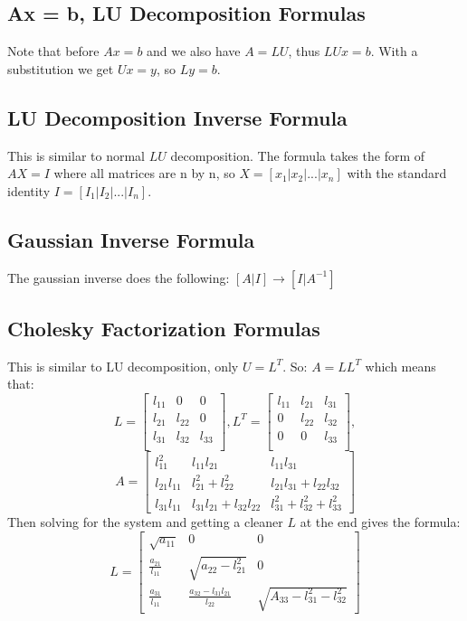 \subsection*{Ax = b, LU Decomposition Formulas}
Note that before $Ax = b$ and we also have $A = LU$, thus $LUx = b$. With a
substitution we get $Ux = y$, so $Ly = b$.

\subsection*{LU Decomposition Inverse Formula}
This is similar to normal $LU$ decomposition. The formula takes the form of
$AX = I$ where all matrices are n by n, so $X = [ x_1 | x_2 | ... | x_n ]$ with
the standard identity $I = [I_1 | I_2 | ... | I_n] $.

\subsection*{Gaussian Inverse Formula}
The gaussian inverse does the following: $[A | I] \rightarrow [I | A^{-1}]$

\subsection*{Cholesky Factorization Formulas}
This is similar to LU decomposition, only $U = L^T$. So: $A = L L^T$ which means
that:
\[
L =
\begin{bmatrix}
  l_{11} & 0 & 0 \\
  l_{21} & l_{22} & 0 \\
  l_{31} & l_{32} & l_{33} \\
\end{bmatrix},
L^T =
\begin{bmatrix}
  l_{11} & l_{21} & l_{31} \\
  0 & l_{22} & l_{32} \\
  0 & 0 & l_{33} \\
\end{bmatrix},
\]
\vspace{42mm}
\[
A =
\begin{bmatrix}
  l_{11}^2 & l_{11}l_{21} & l_{11}l_{31} \\
  l_{21}l_{11} & l_{21}^2 + l_{22}^2 & l_{21}l_{31} + l_{22}l_{32}\\
  l_{31}l_{11} & l_{31}l_{21} + l_{32}l_{22} & l_{31}^2 + l_{32}^2 + l_{33}^2
\end{bmatrix}
\]
Then solving for the system and getting a cleaner $L$ at the end gives the formula:
\[
L =
\begin{bmatrix}
\sqrt{a_{11}} & 0 & 0 \\
\frac{a_{21}}{l_{11}} & \sqrt{a_{22} - l_{21}^2} & 0 \\
\frac{a_{31}}{l_{11}} & \frac{a_{32} - l_{31}l_{21}}{l_{22}} & \sqrt{A_{33} - l_{31}^2 - l_{32}^2}
\end{bmatrix}
\]


